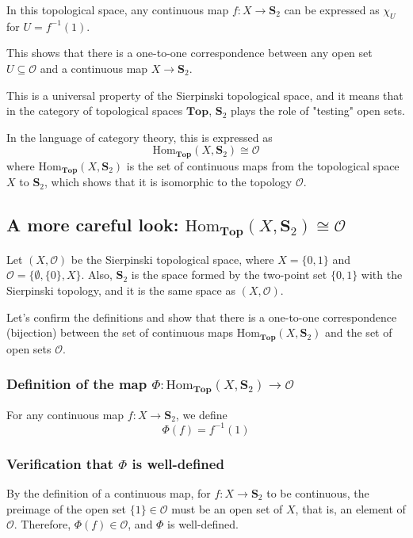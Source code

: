 \documentclass[article,letterpaper,12pt]{jsarticle}
\begin{document}
In this topological space, any continuous map $f: X \to \mathbf{S}_ {2}$ can be expressed as $\chi_{U}$ for $U = f^{-1}(1)$.

This shows that there is a one-to-one correspondence between any open set $U \subseteq \mathcal{O}$ and a continuous map $X \to \mathbf{S}_ {2}$.

This is a universal property of the Sierpinski topological space, and it means that in the category of topological spaces $\mathbf{Top}$, $\mathbf{S}_ {2}$ plays the role of "testing" open sets.

In the language of category theory, this is expressed as
$$
	\mathrm{Hom}_{\mathbf{Top}}(X, \mathbf{S}_ {2}) \cong \mathcal{O}
$$
where $\mathrm{Hom}_{\mathbf{Top}}(X, \mathbf{S}_ {2})$ is the set of continuous maps from the topological space $X$ to $\mathbf{S}_ {2}$, which shows that it is isomorphic to the topology $\mathcal{O}$.


\subsection{\texorpdfstring{A more careful look: $\mathrm{Hom}_{\mathbf{Top}}(X, \mathbf{S}_ {2}) \cong \mathcal{O}$}{A more careful look: Hom(X, S2) is isomorphic to O}}

Let $(X, \mathcal{O})$ be the Sierpinski topological space, where $X = \{0, 1\}$ and $\mathcal{O} = \{\emptyset, \{0\}, X\}$.
Also, $\mathbf{S}_ {2}$ is the space formed by the two-point set $\{0, 1\}$ with the Sierpinski topology, and it is the same space as $(X, \mathcal{O})$.

Let's confirm the definitions and show that there is a one-to-one correspondence (bijection) between the set of continuous maps $\mathrm{Hom}_{\mathbf{Top}}(X, \mathbf{S}_ {2})$ and the set of open sets $\mathcal{O}$.

\subsubsection*{Definition of the map $\Phi: \mathrm{Hom}_{\mathbf{Top}}(X, \mathbf{S}_ {2}) \to \mathcal{O}$}

For any continuous map $f: X \to \mathbf{S}_ {2}$, we define
$$ \Phi(f) = f^{-1}(1) $$
\subsubsection*{Verification that $\Phi$ is well-defined}

By the definition of a continuous map, for $f: X \to \mathbf{S}_ {2}$ to be continuous, the preimage of the open set $\{1\} \in \mathcal{O}$ must be an open set of $X$, that is, an element of $\mathcal{O}$.
Therefore, $\Phi(f) \in \mathcal{O}$, and $\Phi$ is well-defined.
\end{document}
